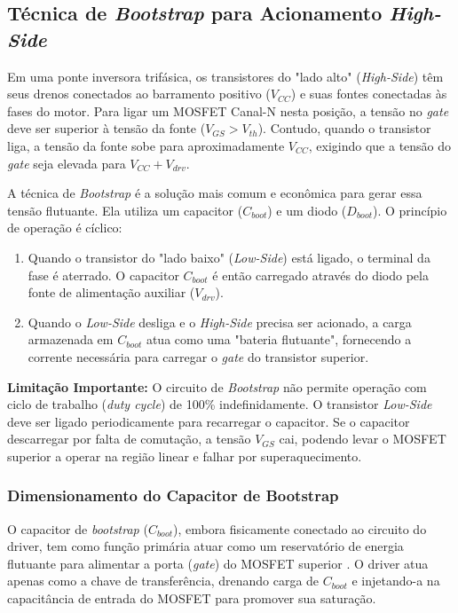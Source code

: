 \subsection{Técnica de \textit{Bootstrap} para Acionamento \textit{High-Side}}
Em uma ponte inversora trifásica, os transistores do "lado alto" (\textit{High-Side}) têm seus drenos conectados ao barramento positivo ($V_{CC}$) e suas fontes conectadas às fases do motor. Para ligar um MOSFET Canal-N nesta posição, a tensão no \textit{gate} deve ser superior à tensão da fonte ($V_{GS} > V_{th}$). Contudo, quando o transistor liga, a tensão da fonte sobe para aproximadamente $V_{CC}$, exigindo que a tensão do \textit{gate} seja elevada para $V_{CC} + V_{drv}$.

A técnica de \textit{Bootstrap} é a solução mais comum e econômica para gerar essa tensão flutuante. Ela utiliza um capacitor ($C_{boot}$) e um diodo ($D_{boot}$). O princípio de operação é cíclico:
\begin{enumerate}
    \item Quando o transistor do "lado baixo" (\textit{Low-Side}) está ligado, o terminal da fase é aterrado. O capacitor $C_{boot}$ é então carregado através do diodo pela fonte de alimentação auxiliar ($V_{drv}$).
    \item Quando o \textit{Low-Side} desliga e o \textit{High-Side} precisa ser acionado, a carga armazenada em $C_{boot}$ atua como uma "bateria flutuante", fornecendo a corrente necessária para carregar o \textit{gate} do transistor superior.
\end{enumerate}

\textbf{Limitação Importante:} O circuito de \textit{Bootstrap} não permite operação com ciclo de trabalho (\textit{duty cycle}) de 100\% indefinidamente. O transistor \textit{Low-Side} deve ser ligado periodicamente para recarregar o capacitor. Se o capacitor descarregar por falta de comutação, a tensão $V_{GS}$ cai, podendo levar o MOSFET superior a operar na região linear e falhar por superaquecimento.

\subsubsection{Dimensionamento do Capacitor de Bootstrap}

O capacitor de \textit{bootstrap} ($C_{boot}$), embora fisicamente conectado ao circuito do driver, tem como função primária atuar como um reservatório de energia flutuante para alimentar a porta (\textit{gate}) do MOSFET superior \cite{infineonAN978}. O driver atua apenas como a chave de transferência, drenando carga de $C_{boot}$ e injetando-a na capacitância de entrada do MOSFET para promover sua saturação.


